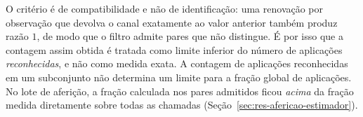 O critério é de compatibilidade e não de identificação: uma renovação por observação que
devolva o canal exatamente ao valor anterior também produz razão $1$, de modo que o
filtro admite pares que não distingue. É por isso que a contagem assim obtida é tratada
como limite inferior do número de aplicações \emph{reconhecidas}, e não como medida
exata. A contagem de aplicações reconhecidas em um subconjunto não determina um limite
para a fração global de aplicações. No lote de aferição, a fração calculada nos pares
admitidos ficou \emph{acima} da fração medida diretamente sobre todas as chamadas
(Seção~\ref{sec:res-afericao-estimador}).


